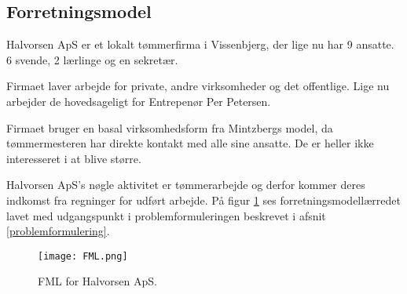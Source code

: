 \subsection{Forretningsmodel}

Halvorsen ApS er et lokalt tømmerfirma i Vissenbjerg, der lige nu har 9 ansatte. 6 svende, 2 lærlinge og en sekretær.

Firmaet laver arbejde for private, andre virksomheder og det offentlige.
Lige nu arbejder de hovedsageligt for Entrepenør Per Petersen.

Firmaet bruger en basal virksomhedsform fra Mintzbergs model, da tømmermesteren har direkte kontakt med alle sine ansatte. De er heller ikke interesseret i at blive større.

Halvorsen ApS's nøgle aktivitet er tømmerarbejde og derfor kommer deres indkomst fra regninger for udført arbejde. På figur \ref{forretningsmodelfigur} ses forretningsmodellærredet lavet med udgangspunkt i problemformuleringen beskrevet i afsnit \ref{problemformulering}.

\begin{figure} 
    \caption{FML for Halvorsen ApS.}
    \centering
    \texttt{[image: FML.png]}
    \label{forretningsmodelfigur}
\end{figure}
